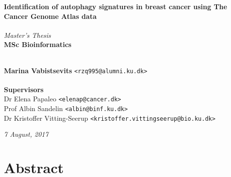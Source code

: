 \documentclass[10pt, openright,oneside]{book}
\begin{document}
\frontmatter
    \thispagestyle{empty}
    
    \vspace*{4.5cm} 
    \noindent \textbf{\huge Identification of autophagy signatures in breast cancer using The Cancer Genome Atlas data} \\
    \\[0.5cm]
    \textit{\Large Master's Thesis} \\
    [0.5cm]
    \textbf{\Large MSc Bioinformatics} \\
    \vspace*{.1cm} \\
    \begin{tabbing}
    \textbf{Marina Vabistsevits} \hspace{1cm} \= \texttt{<rzq995@alumni.ku.dk>} \\
    \\[9cm]
    \textbf{\Large Supervisors} \\
    Dr Elena Papaleo \> \texttt{<elenap@cancer.dk>} \\
    Prof Albin Sandelin \> \texttt{<albin@binf.ku.dk>} \\
    Dr Kristoffer Vitting-Seerup\> \texttt{<kristoffer.vittingseerup@bio.ku.dk>}
    \\[1cm]
    
    \end{tabbing}
    \begin{center}
    \textit{7 August, 2017} 
    \end{center}

    \newpage
    \ClearWallPaper
    



\pagestyle{plain}


\tableofcontents

\mainmatter

\chapter{Abstract}

\end{document}

